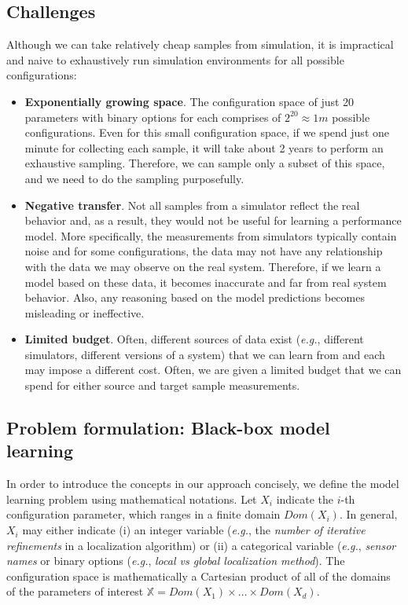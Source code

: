 \subsection{Challenges}

Although we can take relatively cheap samples from simulation, it is impractical and naive to exhaustively run simulation environments for all possible configurations:
\begin{itemize}
\item \textbf{Exponentially growing space}. The configuration space of just 20 parameters with binary options for each comprises of $2^{20}\approx1m$ possible configurations. Even for this small configuration space, if we spend just one minute for collecting each sample, it will take about 2 years to perform an exhaustive sampling. Therefore, we can sample only a subset of this space, and we need to do the sampling purposefully.
\item \textbf{Negative transfer}. Not all samples from a simulator reflect the real behavior and, as a result, they would not be useful for learning a performance model. More specifically, the measurements from simulators typically contain noise and for some configurations, the data may not have any relationship with the data we may observe on the real system. Therefore, if we learn a model based on these data, it becomes inaccurate and far from real system behavior. Also, any reasoning based on the model predictions becomes misleading or ineffective.
\item \textbf{Limited budget}. Often, different sources of data exist (\emph{e.g.}, different simulators, different versions of a system) that we can learn from and each may impose a different cost. Often, we are given a limited budget that we can spend for either source and target sample measurements.
\end{itemize}


\subsection{Problem formulation: Black-box model learning}
\label{sec:problem}

In order to introduce the concepts in our approach concisely, we define the model learning problem using mathematical notations. Let $X_i$ indicate the $i$-th configuration parameter, which ranges in a finite domain $Dom(X_i)$. In general, $X_i$ may either indicate (i) an integer variable (\emph{e.g.}, the \emph{number of iterative refinements} in a localization algorithm) or (ii) a categorical variable (\emph{e.g.}, \emph{sensor names} or binary options (\emph{e.g.}, \emph{local vs global localization method}). The configuration space is mathematically a Cartesian product of all of the domains of the parameters of interest $\mathbb{X}=Dom(X_1) \times \dots \times Dom(X_d)$. %

